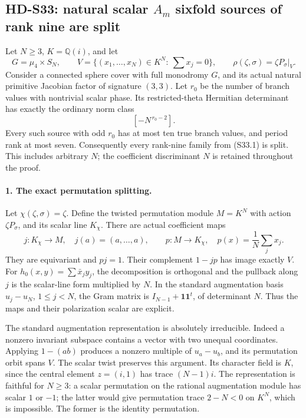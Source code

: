 \subsection{HD-S33: natural scalar \(A_m\) sixfold sources of rank nine are split}
\label{sec:scalar-augmentation-scope}

Let \(N\ge3\), \(K=\mathbb Q(i)\), and let
\[
 G=\mu_4\times S_N,
 \qquad V=\{(x_1,\ldots,x_N)\in K^N:\ \sum x_j=0\},
 \qquad \rho(\zeta,\sigma)=\zeta P_\sigma|_V.
 \tag{S33.1}
\]
Consider a connected sphere cover with full monodromy \(G\), and
its actual natural primitive Jacobian factor of signature \((3,3)\).
Let \(r_0\) be the number of branch values with nontrivial scalar
phase. Its restricted-theta Hermitian determinant has exactly the
ordinary norm class
\[
                         [-N^{\,r_0-2}].                    \tag{S33.2}
\]
Every such source with odd \(r_0\) has at most ten true branch
values, and period rank at most seven. Consequently every rank-nine
family from (S33.1) is split. This includes arbitrary \(N\); the
coefficient discriminant \(N\) is retained throughout the proof.

\paragraph{1. The exact permutation splitting.}
Let \(\chi(\zeta,\sigma)=\zeta\). Define the twisted permutation
module \(M=K^N\) with action \(\zeta P_\sigma\), and its scalar
line \(K_\chi\). There are actual coefficient maps
\[
 j:K_\chi\longrightarrow M,\quad j(a)=(a,\ldots,a),
 \qquad p:M\longrightarrow K_\chi,\quad
                 p(x)=\frac1N\sum_jx_j.
 \tag{S33.3}
\]
They are equivariant and \(pj=1\). Their complement \(1-jp\)
has image exactly \(V\). For \(h_0(x,y)=\sum\bar x_jy_j\),
the decomposition is orthogonal and the pullback along \(j\)
is the scalar-line form multiplied by \(N\). In the standard
augmentation basis \(u_j-u_N\), \(1\le j<N\), the Gram matrix
is \(I_{N-1}+\boldsymbol1\boldsymbol1^t\), of determinant \(N\).
Thus the maps and their polarization scalar are explicit.

The standard augmentation representation is absolutely irreducible.
Indeed a nonzero invariant subspace contains a vector with two
unequal coordinates. Applying \(1-(ab)\) produces a nonzero
multiple of \(u_a-u_b\), and its permutation orbit spans \(V\).
The scalar twist preserves this argument. Its character field is
\(K\), since the central element \(z=(i,1)\) has trace
\((N-1)i\). The representation is faithful for \(N\ge3\): a
scalar permutation on the rational augmentation module has scalar
\(1\) or \(-1\); the latter would give permutation trace
\(2-N<0\) on \(K^N\), which is impossible. The former is
the identity permutation.

